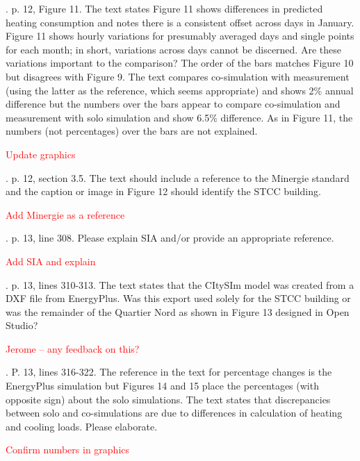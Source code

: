 \documentclass[answers,12pt]{exam}
\begin{document}
\begin{questions}
. p. 12, Figure 11.  The text states Figure 11 shows differences in predicted heating consumption and notes there is a consistent offset across days in January.  Figure 11 shows hourly variations for presumably averaged days and single points for each month; in short, variations across days cannot be discerned.  Are these variations important to the comparison?  The order of the bars matches Figure 10 but disagrees with Figure 9.  The text compares co-simulation with measurement (using the latter as the reference, which seems appropriate) and shows 2\% annual difference but the numbers over the bars appear to compare co-simulation and measurement with solo simulation and show 6.5\% difference.  As in Figure 11, the numbers (not percentages) over the bars are not explained. 
\begin{solution}
\textcolor{red}{Update graphics}
\end{solution}

. p. 12, section 3.5.  The text should include a reference to the Minergie standard and the caption or image in Figure 12 should identify the STCC building. 
\begin{solution}
\textcolor{red}{Add Minergie as a reference}
\end{solution}

. p. 13, line 308.  Please explain SIA and/or provide an appropriate reference.   
\begin{solution}
\textcolor{red}{Add SIA and explain}
\end{solution}

. p. 13, lines 310-313.  The text states that the CItySIm model was created from a DXF file from EnergyPlus.  Was this export used solely for the STCC building or was the remainder of the Quartier Nord as shown in Figure 13 designed in Open Studio? 
\begin{solution}
\textcolor{red}{Jerome -- any feedback on this?}
\end{solution}

. P. 13, lines 316-322.  The reference in the text for percentage changes is the EnergyPlus simulation but Figures 14 and 15 place the percentages (with opposite sign) about the solo simulations.  The text states that discrepancies between solo and co-simulations are due to differences in calculation of heating and cooling loads.  Please elaborate. 
\begin{solution}
\textcolor{red}{Confirm numbers in graphics}
\end{solution}


\end{questions}
\end{document}
